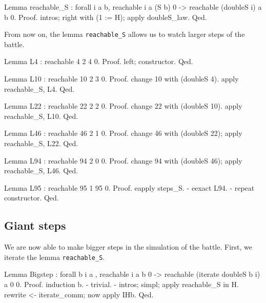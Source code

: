 \documentclass[a4paper]{book}
\begin{document}
\begin{Coqsrc}
Lemma reachable_S  : forall i a b, reachable i a (S b) 0 ->
                                   reachable (doubleS i) a b 0.
Proof.
  intros; right with  (1 := H); apply doubleS_law.
Qed.
\end{Coqsrc}

From now on, the lemma \texttt{reachable\_S} allows us to watch larger steps of 
the battle.


\begin{Coqsrc}
 Lemma L4 : reachable 4 2 4 0.
Proof.
  left; constructor.
Qed.
\end{Coqsrc}

\begin{Coqsrc}
Lemma L10 : reachable 10 2 3 0.
Proof.
  change 10 with (doubleS 4).
  apply reachable_S, L4.
Qed.
\end{Coqsrc}

\begin{Coqsrc}
Lemma L22 : reachable 22 2 2 0.
Proof.
  change 22 with (doubleS 10).
  apply reachable_S, L10.
Qed.
\end{Coqsrc}

\begin{Coqsrc}
Lemma L46 : reachable 46 2 1 0.
Proof.
  change 46 with (doubleS 22); apply  reachable_S, L22.
Qed.
\end{Coqsrc}

\begin{Coqsrc}
Lemma L94 : reachable 94 2 0 0.
Proof.
  change 94 with (doubleS 46); apply reachable_S, L46.
Qed.
\end{Coqsrc}

\begin{Coqsrc}
Lemma L95 : reachable 95 1 95 0.
Proof.
  eapply steps_S.
  -  eexact L94.
  -  repeat constructor.
Qed.
\end{Coqsrc}

\subsection{Giant steps}

We are now able to make bigger steps in the simulation of the battle.
First, we iterate the lemma \texttt{reachable\_S}.

\begin{Coqsrc}
Lemma Bigstep : forall b i a , reachable i a b 0 ->
                               reachable (iterate doubleS b i) a 0 0.
 Proof.
  induction b.
  -  trivial.
  -  intros;  simpl;   apply reachable_S in H.
     rewrite <- iterate_comm; now apply IHb.
 Qed.
\end{Coqsrc}
\end{document}
